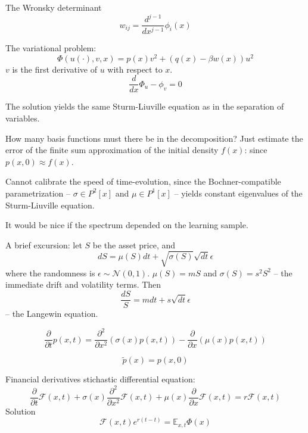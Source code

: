 \documentclass[a4paper]{article}
\newcommand{\clo}[1]{{\left [ #1 \right ]}}
\newcommand{\brac}[1]{{\left ( #1 \right )}}
\newcommand{\Fcal}{\mathcal{F}}
\newcommand{\Ex}{\mathbb{E}}
\begin{document}
The Wronsky determinant \[w_{ij} = \frac{d^{j-1}}{dx^{j-1}} \phi_i(x)\]




The variational problem:
\[\Phi(u(\cdot), v, x) =  p(x) v^2 + \brac{ q(x) - \beta w(x) } u^2\]
$v$ is the first derivative of $u$ with respect to $x$.
\[\frac{d}{dx}\Phi_u - \phi_v = 0\]

The solution yields the same Sturm-Liuville equation as in the separation of variables.

How many basis functions must there be in the decomposition?
Just estimate the error of the finite sum approximation of the initial density $f(x)$: since $p(x,0) \approx f(x)$.


Cannot calibrate the speed of time-evolution, since the Bochner-compatible parametrization -- $\sigma \in P^2\clo{x}$
and $\mu \in P^1\clo{x}$ -- yields constant eigenvalues of the Sturm-Liuville equation.

It would be nice if the spectrum depended on the learning sample.

A brief excursion:
let $S$ be the asset price, and \[dS = \mu(S) dt + \sqrt{\sigma(S)} \sqrt{dt} \epsilon\]
where the randomness is $\epsilon\sim \mathcal{N}(0,1)$.
$\mu(S) = m S$ and $\sigma(S) = s^2 S^2$ -- the immediate drift and volatility terms. Then
\[\frac{dS}{S} = m dt + s \sqrt{dt} \epsilon\]
-- the Langewin equation.

\[\frac{\partial}{\partial t} p(x,t) = \frac{\partial^2}{\partial x^2} \brac{\sigma(x) p(x,t)} - \frac{\partial}{\partial x} \brac{\mu(x) p(x,t)}\]

\[\tilde{p}(x) = p(x,0)\]

Financial derivatives stichastic differential equation:
\[\frac{\partial}{\partial t} \Fcal(x,t) + \sigma(x) \frac{\partial^2}{\partial x^2} \Fcal(x,t) + \mu(x) \frac{\partial}{\partial x} \Fcal(x,t) = r \Fcal(x,t)\]
Solution \[\Fcal(x,t) e^{r(t-t)} = \Ex_{x,t} \Phi(x)\]
\end{document}
